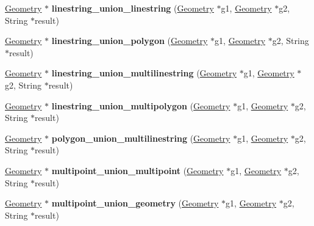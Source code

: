 \begin{DoxyCompactItemize}
\mbox{\hyperlink{classGeometry}{Geometry}} $\ast$ {\bfseries linestring\+\_\+union\+\_\+linestring} (\mbox{\hyperlink{classGeometry}{Geometry}} $\ast$g1, \mbox{\hyperlink{classGeometry}{Geometry}} $\ast$g2, String $\ast$result)
\item 
\mbox{\label{classBG__setop__wrapper_a73429bdade8ef3f25b5bc0f60671a849}} 
\mbox{\hyperlink{classGeometry}{Geometry}} $\ast$ {\bfseries linestring\+\_\+union\+\_\+polygon} (\mbox{\hyperlink{classGeometry}{Geometry}} $\ast$g1, \mbox{\hyperlink{classGeometry}{Geometry}} $\ast$g2, String $\ast$result)
\item 
\mbox{\label{classBG__setop__wrapper_adb23393188b3cb33070e036514a6fa17}} 
\mbox{\hyperlink{classGeometry}{Geometry}} $\ast$ {\bfseries linestring\+\_\+union\+\_\+multilinestring} (\mbox{\hyperlink{classGeometry}{Geometry}} $\ast$g1, \mbox{\hyperlink{classGeometry}{Geometry}} $\ast$g2, String $\ast$result)
\item 
\mbox{\label{classBG__setop__wrapper_a60e5b765d80d62974b2c623ce22e344c}} 
\mbox{\hyperlink{classGeometry}{Geometry}} $\ast$ {\bfseries linestring\+\_\+union\+\_\+multipolygon} (\mbox{\hyperlink{classGeometry}{Geometry}} $\ast$g1, \mbox{\hyperlink{classGeometry}{Geometry}} $\ast$g2, String $\ast$result)
\item 
\mbox{\label{classBG__setop__wrapper_a52bd57228f1d55c12338c23a626134c6}} 
\mbox{\hyperlink{classGeometry}{Geometry}} $\ast$ {\bfseries polygon\+\_\+union\+\_\+multilinestring} (\mbox{\hyperlink{classGeometry}{Geometry}} $\ast$g1, \mbox{\hyperlink{classGeometry}{Geometry}} $\ast$g2, String $\ast$result)
\item 
\mbox{\label{classBG__setop__wrapper_ae25772773e8397c721108a3a97d27142}} 
\mbox{\hyperlink{classGeometry}{Geometry}} $\ast$ {\bfseries multipoint\+\_\+union\+\_\+multipoint} (\mbox{\hyperlink{classGeometry}{Geometry}} $\ast$g1, \mbox{\hyperlink{classGeometry}{Geometry}} $\ast$g2, String $\ast$result)
\item 
\mbox{\label{classBG__setop__wrapper_a35fa10085b63d9adcc0f96d1003c7849}} 
\mbox{\hyperlink{classGeometry}{Geometry}} $\ast$ {\bfseries multipoint\+\_\+union\+\_\+geometry} (\mbox{\hyperlink{classGeometry}{Geometry}} $\ast$g1, \mbox{\hyperlink{classGeometry}{Geometry}} $\ast$g2, String $\ast$result)

\end{DoxyCompactItemize}
